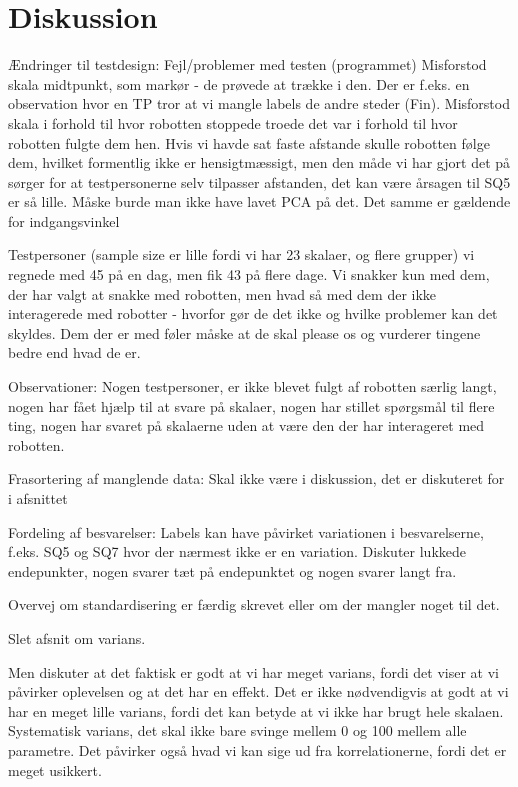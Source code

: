 \chapter{Diskussion}
\label{TestAfSkalaDiskussion}
Ændringer til testdesign: Fejl/problemer med testen (programmet)
Misforstod skala midtpunkt, som markør - de prøvede at trække i den. Der er f.eks. en observation hvor en TP tror at vi mangle labels de andre steder (Fin). Misforstod skala i forhold til hvor robotten stoppede troede det var i forhold til hvor robotten fulgte dem hen. Hvis vi havde sat faste afstande skulle robotten følge dem, hvilket formentlig ikke er hensigtmæssigt, men den måde vi har gjort det på sørger for at testpersonerne selv tilpasser afstanden, det kan være årsagen til SQ5 er så lille. Måske burde man ikke have lavet PCA på det. Det samme er gældende for indgangsvinkel    

Testpersoner (sample size er lille fordi vi har 23 skalaer, og flere grupper) vi regnede med 45 på en dag, men fik 43 på flere dage. Vi snakker kun med dem, der har valgt at snakke med robotten, men hvad så med dem der ikke interagerede med robotter - hvorfor gør de det ikke og hvilke problemer kan det skyldes. Dem der er med føler måske at de skal please os og vurderer tingene bedre end hvad de er. 

Observationer: Nogen testpersoner, er ikke blevet fulgt af robotten særlig langt, nogen har fået hjælp til at svare på skalaer, nogen har stillet spørgsmål til flere ting, nogen har svaret på skalaerne uden at være den der har interageret med robotten. 

Frasortering af manglende data: Skal ikke være i diskussion, det er diskuteret for i afsnittet

Fordeling af besvarelser: Labels kan have påvirket variationen i besvarelserne, f.eks. SQ5 og SQ7 hvor der nærmest ikke er en variation. Diskuter lukkede endepunkter, nogen svarer tæt på endepunktet og nogen svarer langt fra. 

Overvej om standardisering er færdig skrevet eller om der mangler noget til det. 

Slet afsnit om varians. 


Men diskuter at det faktisk er godt at vi har meget varians, fordi det viser at vi påvirker oplevelsen og at det har en effekt. Det er ikke nødvendigvis at godt at vi har en meget lille varians, fordi det kan betyde at vi ikke har brugt hele skalaen. Systematisk varians, det skal ikke bare svinge mellem 0 og 100 mellem alle parametre. Det påvirker også hvad vi kan sige ud fra korrelationerne, fordi det er meget usikkert. 

